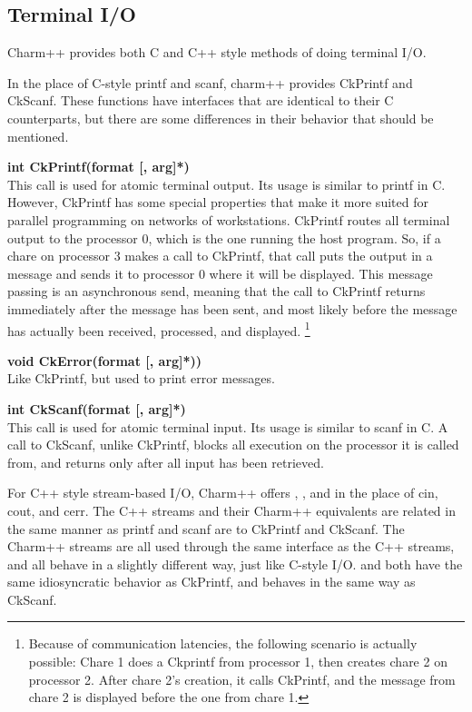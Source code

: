 \subsection{Terminal I/O}

Charm++ provides both C and C++ style methods of doing terminal I/O.  

In the place of C-style printf and scanf, charm++ provides
CkPrintf and CkScanf.  These functions have
interfaces that are identical to their C counterparts, but there are some
differences in their behavior that should be mentioned.

{\bf int CkPrintf(format [, arg]*)}   \\
This call is used for atomic terminal output. Its usage is similar to {\sf
printf} in C.  However, CkPrintf has some special properties that make it more
suited for parallel programming on networks of workstations.  CkPrintf routes
all terminal output to the processor 0, which is the one running the host
program.  So, if a chare on processor 3 makes a call to CkPrintf,
that call puts the output in a message and sends it to processor
0 where it will be displayed.  This message passing is an asynchronous send,
meaning that the call to CkPrintf returns immediately after the message has
been sent, and most likely before the message has actually been received,
processed, and displayed. \footnote{Because of communication latencies, the
following scenario is actually possible: Chare 1 does a Ckprintf from processor
1, then creates chare 2 on processor 2.  After chare 2's creation, it calls
CkPrintf, and the message from chare 2 is displayed before the one from chare
1.}   

{\bf void CkError(format [, arg]*))}   \\
Like CkPrintf, but used to print error messages.

{\bf int CkScanf(format [, arg]*)}   \\
This call is used for atomic terminal input. Its usage is similar to
{\sf scanf} in C.  A call to CkScanf, unlike CkPrintf, blocks all execution on
the processor it is called from, and returns only after all input has been
retrieved.

For C++ style stream-based I/O, Charm++ offers ,
, and  in the place of
cin, cout, and cerr.  The C++ streams and their Charm++ equivalents are related
in the same manner as printf and scanf are to CkPrintf and CkScanf.  The
Charm++ streams are all used through the same interface as the C++ streams, and
all behave in a slightly different way, just like C-style I/O.  
and  both have the same idiosyncratic behavior as CkPrintf, and
 behaves in the same way as CkScanf.

